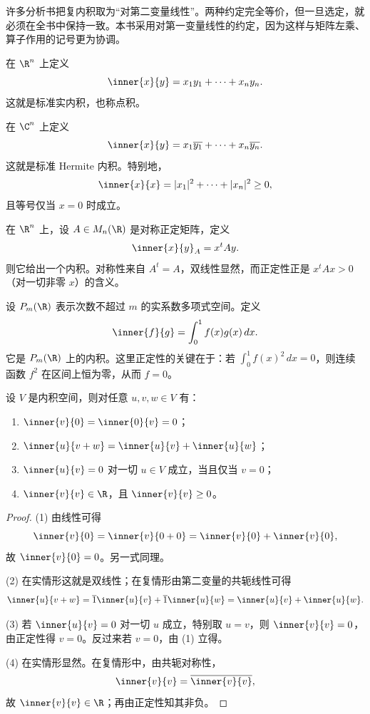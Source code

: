 \begin{remark}
许多分析书把复内积取为“对第二变量线性”。两种约定完全等价，但一旦选定，就必须在全书中保持一致。本书采用对第一变量线性的约定，因为这样与矩阵左乘、算子作用的记号更为协调。
\end{remark}

\begin{example}
在 $\R^n$ 上定义
\[
\inner{x}{y}=x_1y_1+\cdots+x_ny_n.
\]
这就是标准实内积，也称点积。
\end{example}

\begin{example}
在 $\C^n$ 上定义
\[
\inner{x}{y}=x_1\overline{y_1}+\cdots+x_n\overline{y_n}.
\]
这就是标准 Hermite 内积。特别地，
\[
\inner{x}{x}=|x_1|^2+\cdots+|x_n|^2\ge 0,
\]
且等号仅当 $x=0$ 时成立。
\end{example}

\begin{example}
在 $\R^n$ 上，设 $A\in M_n(\R)$ 是对称正定矩阵，定义
\[
\inner{x}{y}_A=x^tAy.
\]
则它给出一个内积。对称性来自 $A^t=A$，双线性显然，而正定性正是 $x^tAx>0$（对一切非零 $x$）的含义。
\end{example}

\begin{example}
设 $P_{m}(\R)$ 表示次数不超过 $m$ 的实系数多项式空间。定义
\[
\inner{f}{g}=\int_0^1 f(x)g(x)\,dx.
\]
它是 $P_m(\R)$ 上的内积。这里正定性的关键在于：若 $\int_0^1 f(x)^2\,dx=0$，则连续函数 $f^2$ 在区间上恒为零，从而 $f=0$。
\end{example}

\begin{proposition}
设 $V$ 是内积空间，则对任意 $u,v,w\in V$ 有：
\begin{enumerate}[label=\textnormal{(\arabic*)}]
  \item $\inner{v}{0}=\inner{0}{v}=0$；
  \item $\inner{u}{v+w}=\inner{u}{v}+\inner{u}{w}$；
  \item $\inner{u}{v}=0$ 对一切 $u\in V$ 成立，当且仅当 $v=0$；
  \item $\inner{v}{v}\in\R$，且 $\inner{v}{v}\ge 0$。
\end{enumerate}
\end{proposition}

\begin{proof}
(1) 由线性可得
\[
\inner{v}{0}=\inner{v}{0+0}=\inner{v}{0}+\inner{v}{0},
\]
故 $\inner{v}{0}=0$。另一式同理。

(2) 在实情形这就是双线性；在复情形由第二变量的共轭线性可得
\[
\inner{u}{v+w}=\overline{1}\inner{u}{v}+\overline{1}\inner{u}{w}=\inner{u}{v}+\inner{u}{w}.
\]

(3) 若 $\inner{u}{v}=0$ 对一切 $u$ 成立，特别取 $u=v$，则 $\inner{v}{v}=0$，由正定性得 $v=0$。反过来若 $v=0$，由 (1) 立得。

(4) 在实情形显然。在复情形中，由共轭对称性，
\[
\inner{v}{v}=\overline{\inner{v}{v}},
\]
故 $\inner{v}{v}\in\R$；再由正定性知其非负。
\end{proof}

